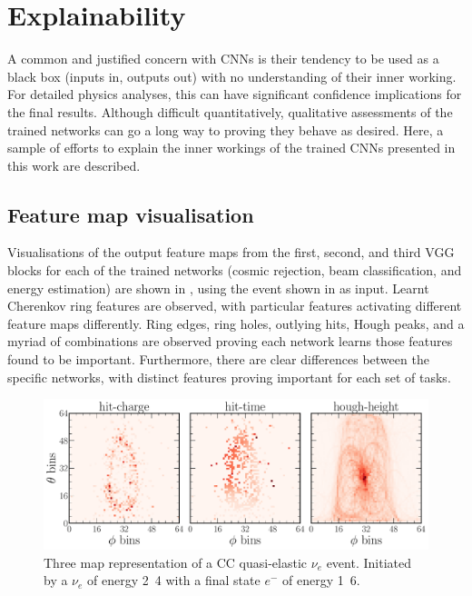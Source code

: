 \section{Explainability} %
\label{sec:results_explain} %

A common and justified concern with CNNs is their tendency to be used as a black box (inputs in,
outputs out) with no understanding of their inner working. For detailed physics analyses, this can
have significant confidence implications for the final results. Although difficult quantitatively,
qualitative assessments of the trained networks can go a long way to proving they behave as
desired. Here, a sample of efforts to explain the inner workings of the trained CNNs presented in
this work are described.

\subsection{Feature map visualisation} %
\label{sec:results_explain_vis} %

Visualisations of the output feature maps from the first, second, and third VGG blocks for each of
the trained networks (cosmic rejection, beam classification, and energy estimation) are shown in
, using the event shown in 
as input. Learnt Cherenkov ring features are observed, with particular features activating
different feature maps differently. Ring edges, ring holes, outlying hits, Hough peaks, and a
myriad of combinations are observed proving each network learns those features found to be
important. Furthermore, there are clear differences between the specific networks, with distinct
features proving important for each set of tasks.

\begin{figure} %
    \includegraphics[width=\textwidth]{diagrams/7-results/explain_example_event.pdf}
    \caption[Example CC quasi-elastic $\nu_{e}$ event for explainability]
    {Three map representation of a CC quasi-elastic $\nu_{e}$ event. Initiated by a $\nu_{e}$ of
        energy \unit{2.4}{\GeV} with a final state $e^{-}$ of energy \unit{1.6}{\GeV}.}
    \label{fig:explain_example_event}
\end{figure}

